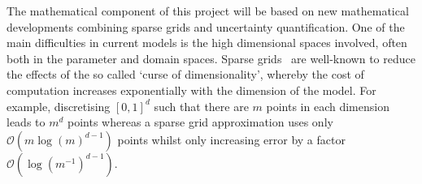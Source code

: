 \documentclass[a4paper,fontsize=12pt]{scrartcl}
\begin{document}
%
%
%
%




The mathematical component of this project will be based on new
mathematical developments combining sparse grids and uncertainty
quantification. One of the main difficulties in current models is the
high dimensional spaces involved, often both in the parameter and
domain spaces. Sparse grids~\parencite{BungartzGriebel2004} are
well-known to reduce the effects of the so called `curse of
dimensionality', whereby the cost of computation increases
exponentially with the dimension of the model. For example,
discretising $[0,1]^{d}$ such that there are $m$ points in each
dimension leads to $m^{d}$ points whereas a sparse grid approximation
uses only $\mathcal{O}(m\log(m)^{d-1})$ points whilst only increasing
error by a factor $\mathcal{O}(\log(m^{-1})^{d-1})$.
\end{document}
